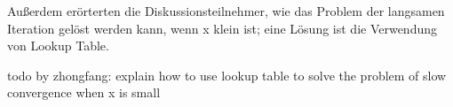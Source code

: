 \documentclass[course=erap]{aspdoc}
\begin{document}
\par
Außerdem erörterten die Diskussionsteilnehmer, wie das Problem der langsamen Iteration gelöst werden kann, wenn x klein ist; eine Lösung ist die Verwendung von Lookup Table\cite{wikipedia2023lookuptable}.

\par
todo by zhongfang: explain how to use lookup table to solve the problem of slow convergence when x is small



\end{document}
